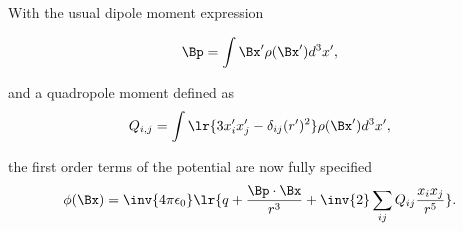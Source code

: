 With the usual dipole moment expression

\begin{dmath}\label{eqn:emtLecture8:580}
\Bp = \int \Bx' \rho(\Bx') d^3 x',
\end{dmath}

and a quadropole moment defined as
\begin{dmath}\label{eqn:emtLecture8:600}
Q_{i,j} = \int \lr{ 3 x_i' x_j' - \delta_{ij} (r')^2 } \rho(\Bx') d^3 x',
\end{dmath}

the first order terms of the potential are now fully specified
\begin{dmath}\label{eqn:emtLecture8:620}
\phi(\Bx)
=
\inv{4 \pi \epsilon_0}
\lr{ 
q + \frac{\Bp \cdot \Bx}{r^3} + 
\inv{2} \sum_{ij} Q_{ij} \frac{x_i x_j}{r^5}
}.
\end{dmath}
